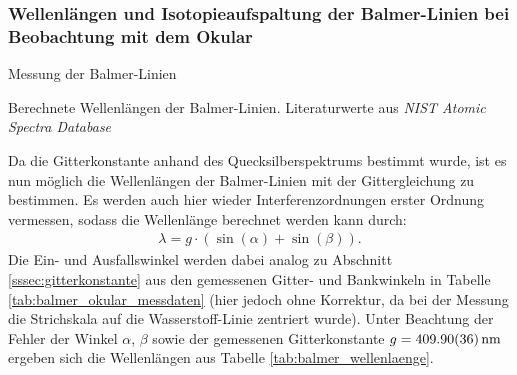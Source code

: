 \documentclass[11pt, a4paper]{article}
\numberwithin{equation}{section}
\begin{document}
\subsubsection{Wellenlängen und Isotopieaufspaltung der Balmer-Linien bei Beobachtung mit dem Okular}
\begin{table}[h]
	\centering
	
	\caption{Messung der Balmer-Linien}
	\label{tab:balmer_okular_messdaten}
\end{table}
\begin{table}[h]
	\centering
	
	\caption{Berechnete Wellenlängen der Balmer-Linien. Literaturwerte aus \emph{NIST Atomic Spectra Database} \cite{NISTSpectra}}
	\label{tab:balmer_wellenlaenge}
\end{table}
Da die Gitterkonstante anhand des Quecksilberspektrums bestimmt wurde, ist es nun möglich die Wellenlängen der Balmer-Linien mit der Gittergleichung zu bestimmen.
Es werden auch hier wieder Interferenzordnungen erster Ordnung vermessen, sodass die Wellenlänge berechnet werden kann durch:
\begin{align*}
  \lambda = g \cdot ( \sin(\alpha) + \sin(\beta)) \text{.}
\end{align*}
Die Ein- und Ausfallswinkel werden dabei analog zu Abschnitt \ref{sssec:gitterkonstante} aus den gemessenen Gitter- und Bankwinkeln in Tabelle \ref{tab:balmer_okular_messdaten} (hier jedoch ohne Korrektur, da bei der Messung die Strichskala auf die Wasserstoff-Linie zentriert wurde).
Unter Beachtung der Fehler der Winkel $\alpha$, $\beta$ sowie der gemessenen Gitterkonstante $g = \SI{409.90 +- 0.36}{\nano\metre}$ ergeben sich die Wellenlängen aus Tabelle \ref{tab:balmer_wellenlaenge}.
\end{document}
